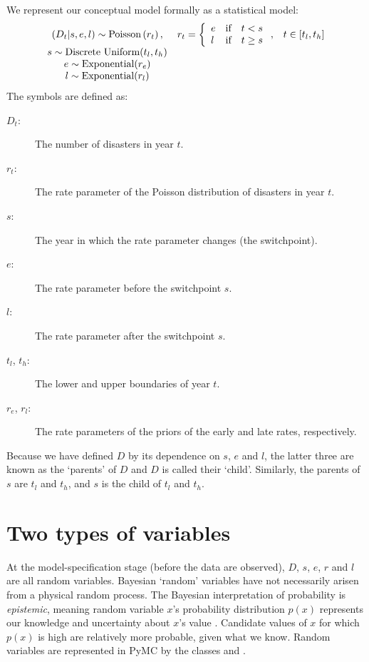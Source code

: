 We represent our conceptual model formally as a statistical model:
\begin{equation}
    \begin{array}{ccc}
        (D_t | s, e, l) \sim \textup{Poisson}\left(r_t\right), & r_t=\left\{\begin{array}{lll}
            e &\textup{if}& t< s\\ l &\textup{if}& t\ge s
            \end{array}\right.,&t\in[t_l,t_h]\\
        s\sim \textup{Discrete Uniform}(t_l, t_h)\\
        e\sim \textup{Exponential}(r_e)\\
        l\sim \textup{Exponential}(r_l)
    \end{array}
    \label{disastermodel}
\end{equation}
The symbols are defined as:
\begin{description}
    \item[$D_t$:] The number of disasters in year $t$.
    \item[$r_t$:] The rate parameter of the Poisson distribution of disasters in year $t$.
    \item[$s$:] The year in which the rate parameter changes (the switchpoint).
    \item[$e$:] The rate parameter before the switchpoint $s$.
    \item[$l$:] The rate parameter after the switchpoint $s$.
    \item[$t_l$, $t_h$:] The lower and upper boundaries of year $t$.
    \item[$r_e$, $r_l$:] The rate parameters of the priors of the early and late rates, respectively.
\end{description}
Because we have defined $D$ by its dependence on $s$, $e$ and $l$, the latter three are known as the `parents' of $D$ and $D$ is called their `child'. Similarly, the parents of $s$ are $t_l$ and $t_h$, and $s$ is the child of $t_l$ and $t_h$.

\section{Two types of variables}

At the model-specification stage (before the data are observed), $D$, $s$, $e$,
$r$ and $l$ are all random variables. Bayesian `random' variables have not
necessarily arisen from a physical random process. The Bayesian interpretation
of probability is \emph{epistemic}, meaning random variable $x$'s probability
distribution $p(x)$ represents our knowledge and uncertainty about $x$'s value
\citep{jaynes}. Candidate values of $x$ for which $p(x)$ is high are
relatively more probable, given what we know. Random variables are represented
in PyMC by the classes  and .

